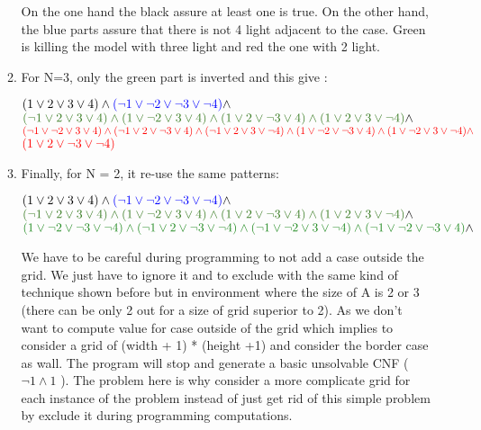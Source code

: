 \documentclass[a4paper]{article}
\begin{document}
\begin{enumerate}
\begin{enumerate}
On the one hand the black assure at least one is true. On the other hand, the blue parts assure that there is not 4 light adjacent to the case. Green is killing the model with three light and red the one with 2 light.
\item For N=3,  only the green part is inverted and this give :\newline
\begin{center}
$ ( 1 \lor 2 \lor 3 \lor 4) \land \textcolor{blue}{( \neg 1 \lor \neg 2 \lor \neg 3 \lor \neg 4)}  \land $ \newline
$\textcolor{OliveGreen}{( \neg 1 \lor 2 \lor 3 \lor 4 ) \land  ( 1 \lor \neg 2 \lor 3 \lor 4 ) \land ( 1 \lor 2 \lor \neg 3 \lor 4 ) \land ( 1 \lor 2 \lor 3 \lor \neg 4 )} \land $ \newline
$\textcolor{red}{( \neg 1 \lor \neg 2 \lor 3 \lor 4) \land ( \neg 1 \lor 2 \lor \neg 3 \lor 4 ) \land ( \neg 1 \lor 2 \lor 3 \lor \neg 4 ) \land ( 1 \lor \neg 2 \lor \neg 3 \lor 4 ) \land ( 1 \lor \neg 2 \lor 3 \lor \neg 4 ) \land} $ \newline $\textcolor{red}{ ( 1 \lor 2 \lor \neg 3 \lor \neg 4 )} $
\end{center}
\item Finally, for N = 2, it re-use the same patterns: \newline
\begin{center}
$ ( 1 \lor 2 \lor 3 \lor 4) \land \textcolor{blue}{( \neg 1 \lor \neg 2 \lor \neg 3 \lor \neg 4)}  \land $ \newline 
$\textcolor{OliveGreen}{( \neg 1 \lor 2 \lor 3 \lor 4 ) \land  ( 1 \lor \neg 2 \lor 3 \lor 4 ) \land ( 1 \lor 2 \lor \neg 3 \lor 4 ) \land ( 1 \lor 2 \lor 3 \lor \neg 4 )} \land $ \newline $\textcolor{ForestGreen}{( 1 \lor \neg 2 \lor \neg 3 \lor \neg 4 ) \land  ( \neg 1 \lor 2 \lor \neg 3 \lor \neg 4 ) \land ( \neg 1 \lor \neg 2 \lor 3 \lor \neg 4 ) \land ( \neg 1 \lor \neg 2 \lor \neg 3 \lor 4 )} \land $
\end{center}
We have to be careful during programming to not add a case outside the grid. We just have to ignore it and to exclude with the same kind of technique shown before but in environment where the size of A is 2 or 3 (there can be only 2 out for a size of grid superior to 2). As we don't want to compute value for case outside of the grid which implies to consider a grid of (width + 1) * (height +1) and consider the border case as wall. The program will stop and generate a basic unsolvable CNF ( $\neg 1 \land 1 $ ). The problem here is why consider a more complicate grid for each instance of the problem instead of just get rid of this simple problem by exclude it during programming computations. 


\end{enumerate}
\end{enumerate}
\end{document}
